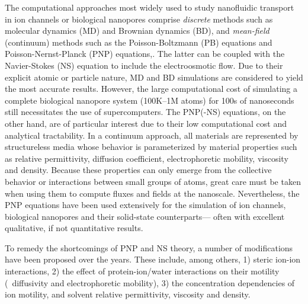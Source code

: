 \documentclass[journal=ancac3,manuscript=article,etalmode=truncate,maxauthors=0,layout=onecolumn]{achemso}
\begin{document}
The computational approaches most widely used to study nanofluidic transport in
ion channels or biological nanopores comprise \emph{discrete} methods such as
molecular dynamics
(MD)\cite{Lynden-Bell-1996,Allen-1999,Aksimentiev-2005,Luan-2008,Bhattacharya-2011,Zhang-2014,DiMarino-2015,Belkin-2016}
and Brownian dynamics
(BD),\cite{Schirmer-1999,Im-2002,Noskov-2004,Millar-2008,Egwolf-2010,DeBiase-2015,Pederson-2015}
and \emph{mean-field} (continuum) methods such as the Poisson-Boltzmann (PB)
equations\cite{Grochowski-2008, Baldessari-2008-1} and Poisson-Nernst-Planck
(PNP) equations,\cite{Eisenberg-1996,Gillespie-2002, Simakov-2010}. The latter
can be coupled with the Navier-Stokes (NS) equation to include the
electroosmotic flow.\cite{Lu-2012,Pederson-2015} Due to their explicit atomic or
particle nature, MD and BD simulations are considered to yield the most accurate
results. However, the large computational cost of simulating a complete
biological nanopore system (100K--1M atoms) for 100s of nanoseconds still
necessitates the use of supercomputers.\cite{Aksimentiev-2005,Bhattacharya-2011}
The PNP(-NS) equations, on the other hand, are of particular interest due to
their low computational cost and analytical tractability. In a continuum
approach, all materials are represented by structureless media whose behavior is
parameterized by material properties such as relative permittivity, diffusion
coefficient, electrophoretic mobility, viscosity and density. Because these
properties can only emerge from the collective behavior or interactions between
small groups of atoms, great care must be taken when using them to compute
fluxes and fields at the nanoscale.\cite{Corry-2000,Collins-2012} Nevertheless,
the PNP equations have been used extensively for the simulation of ion
channels,\cite{Im-2002,Furini-2006,Liu-2015} biological
nanopores\cite{Simakov-2010,Pederson-2015,Aguilella-Arzo-2017,Simakov-2018} and
their solid-state
counterparts\cite{Cervera-2005,White-2008,Chaudhry-2014,Laohakunakorn-2015}---
often with excellent qualitative, if not quantitative
results.\cite{Maffeo-2012,Thomas-2014,Kim-2015}

To remedy the shortcomings of PNP and NS theory, a number of modifications have
been proposed over the years. These include, among others, 1) steric ion-ion
interactions, 2) the effect of protein-ion/water interactions on their motility
(\ie{}~diffusivity and electrophoretic mobility), 3) the concentration
dependencies of ion motility, and solvent relative permittivity, viscosity and
density.
\end{document}
